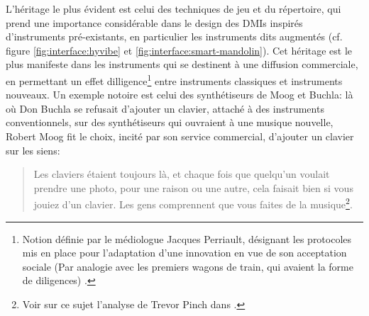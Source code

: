  \noindent L'héritage le plus évident est celui des techniques de jeu et du répertoire, qui prend une importance considérable dans le design des \glspl{DMI} inspirés d'instruments pré-existants, en particulier les instruments dits augmentés (cf. figure \ref{fig:interface:hyvibe} et \ref{fig:interface:smart-mandolin}). Cet héritage est le plus manifeste dans les instruments qui se destinent à une diffusion commerciale, en permettant un effet dilligence\footnote{Notion définie par le médiologue Jacques Perriault, désignant les protocoles mis en place pour l'adaptation d'une innovation en vue de son acceptation sociale (Par analogie avec les premiers wagons de train, qui avaient la forme de diligences) \cite{perriault_lacces_2002}.} entre instruments classiques et instruments nouveaux. Un exemple notoire est celui des synthétiseurs de Moog et Buchla: là où Don Buchla se refusait d'ajouter un clavier, attaché à des instruments conventionnels, sur des synthétiseurs qui ouvraient à une musique nouvelle, Robert Moog fit le choix, incité par son service commercial, d'ajouter un clavier sur les siens:
	\begin{quotation}
	\noindent Les claviers étaient toujours là, et chaque fois que quelqu'un voulait prendre une photo, pour une raison ou une autre, cela faisait bien si vous jouiez d'un clavier. Les gens comprennent que vous faites de la musique\footnote{ \label{fn:Pinch}Voir sur ce sujet l'analyse de Trevor Pinch dans \cite{pinch_why_2001}.}.
	\end{quotation}
